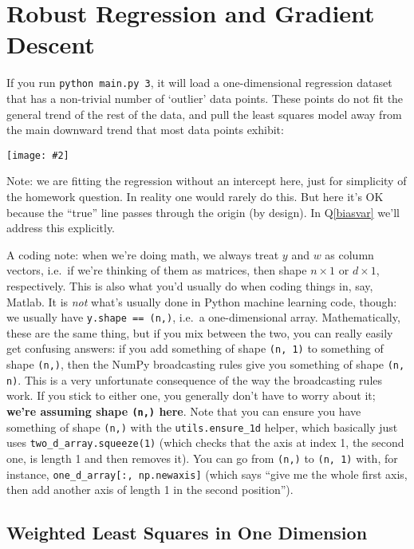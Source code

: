 \documentclass{article}
\newcommand{\centerfig}[2]{\begin{center}\texttt{[image: \#2]}\end{center}}
\begin{document}
\pagebreak
\section{Robust Regression and Gradient Descent }

If you run \verb|python main.py 3|, it will load a one-dimensional regression
dataset that has a non-trivial number of `outlier' data points.
These points do not fit the general trend of the rest of the data,
and pull the least squares model away from the main downward trend that most data points exhibit:
\centerfig{.7}{./figs/least_squares_outliers.pdf}

Note: we are fitting the regression without an intercept here, just for simplicity of the homework question.
In reality one would rarely do this. But here it's OK because the ``true'' line
passes through the origin (by design). In Q\ref{biasvar} we'll address this explicitly.

A coding note:
when we're doing math, we always treat $y$ and $w$ as column vectors,
i.e.\ if we're thinking of them as matrices, then shape $n \times 1$ or $d \times 1$, respectively.
This is also what you'd usually do when coding things in, say, Matlab.
It is \emph{not} what's usually done in Python machine learning code, though:
we usually have \verb|y.shape == (n,)|, i.e.\ a one-dimensional array.
Mathematically, these are the same thing, but if you mix between the two,
you can really easily get confusing answers:
if you add something of shape \texttt{(n, 1)} to something of shape \texttt{(n,)},
then the NumPy broadcasting rules give you something of shape \texttt{(n, n)}.
This is a very unfortunate consequence of the way the broadcasting rules work.
If you stick to either one, you generally don't have to worry about it;
\textbf{we're assuming shape \texttt{(n,)} here}.
Note that you can
ensure you have something of shape \texttt{(n,)} with the \texttt{utils.ensure\_1d} helper, which basically just uses
\texttt{two\_d\_array.squeeze(1)}
(which checks that the axis at index 1, the second one, is length 1 and then removes it).
You can go from \texttt{(n,)} to \texttt{(n, 1)} with, for instance, \texttt{one\_d\_array[:, np.newaxis]}
(which says ``give me the whole first axis, then add another axis of length 1 in the second position'').

\pagebreak

\subsection{Weighted Least Squares in One Dimension }
\end{document}
